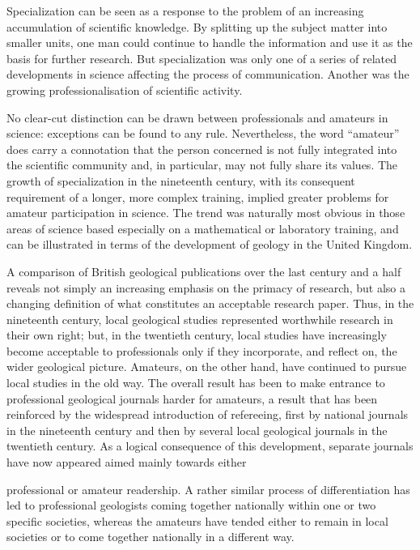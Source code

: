 \documentclass[a4paper]{article}
\begin{document}
\par
Specialization can be seen as a response to the problem of an increasing accumulation of scientific knowledge. By splitting up the subject matter into smaller units, one man could continue to handle the information and use it as the basis for further research. But specialization was only one of a series of related developments in science affecting the process of communication. Another was the growing professionalisation of scientific activity.

\par
No clear-cut distinction can be drawn between professionals and amateurs in science: exceptions can be found to any rule. Nevertheless, the word “amateur” does carry a connotation that the person concerned is not fully integrated into the scientific community and, in particular, may not fully share its values. The growth of specialization in the nineteenth century, with its consequent requirement of a longer, more complex training, implied greater problems for amateur participation in science. The trend was naturally most obvious in those areas of science based especially on a mathematical or laboratory training, and can be illustrated in terms of the development of geology in the United Kingdom.

\par
A comparison of British geological publications over the last century and a half reveals not simply an increasing emphasis on the primacy of research, but also a changing definition of what constitutes an acceptable research paper. Thus, in the nineteenth century, local geological studies represented worthwhile research in their own right; but, in the twentieth century, local studies have increasingly become acceptable to professionals only if they incorporate, and reflect on, the wider geological picture. Amateurs, on the other hand, have continued to pursue local studies in the old way. The overall result has been to make entrance to professional geological journals harder for amateurs, a result that has been reinforced by the widespread introduction of refereeing, first by national journals in the nineteenth century and then by several local geological journals in the twentieth century. As a logical consequence of this development, separate journals have now appeared aimed mainly towards either

\par
professional or amateur readership. A rather similar process of differentiation has led to professional geologists coming together nationally within one or two specific societies, whereas the amateurs have tended either to remain in local societies or to come together nationally in a different way.
\end{document}
